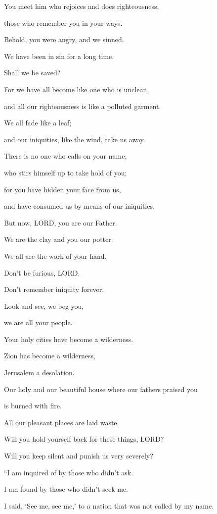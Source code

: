 \myverse{}You meet him who rejoices and does righteousness,

those who remember you in your ways.

Behold, you were angry, and we sinned.

We have been in sin for a long time.

Shall we be saved?

\myverse{}For we have all become like one who is unclean,

and all our righteousness is like a polluted garment.

We all fade like a leaf;

and our iniquities, like the wind, take us away.

\myverse{}There is no one who calls on your name,

who stirs himself up to take hold of you;

for you have hidden your face from us,

and have consumed us by means of our iniquities.


\vspace{\baselineskip} \myverse{}But now, LORD, you are our Father.

We are the clay and you our potter.

We all are the work of your hand.

\myverse{}Don’t be furious, LORD.

Don’t remember iniquity forever.

Look and see, we beg you,

we are all your people.

\myverse{}Your holy cities have become a wilderness.

Zion has become a wilderness,

Jerusalem a desolation.

\myverse{}Our holy and our beautiful house where our fathers praised
you

is burned with fire.

All our pleasant places are laid waste.

\myverse{}Will you hold yourself back for these things, LORD?

Will you keep silent and punish us very severely?


\mychapter{} \myverse*{}“I am inquired of by those who didn’t ask.

\quad\quad I am found by those who didn’t seek me.

I said, ‘See me, see me,’ to a nation that was not called by my name.

